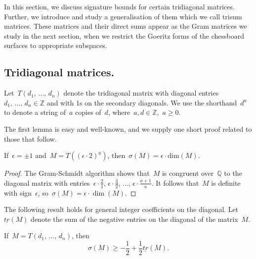 \documentclass[AHL,Unicode,longabstracts,published]{cedram}
\newcommand{\rdim}{\mathrm{dim}}
\newcommand{\bbZ}{\mathbb{Z}}
\newcommand{\bbQ}{\mathbb{Q}}
\begin{document}
In this section, we discuss signature bounds for certain tridiagonal matrices. Further, we introduce and study a generalisation of them which we call trisum matrices. These matrices and their direct sums appear as the Gram matrices we study in the next section, when we restrict the Goeritz forms of the chessboard surfaces to appropriate subspaces.


\subsection{Tridiagonal matrices.} 

Let~$T(d_1,\,\dots,\,d_n)$ denote the tridiagonal matrix with diagonal entries~$d_1,\,\dots,\,d_n \in \bbZ$ and with 1s on the secondary diagonals. We use the shorthand~$d^{\underline a}$ to denote a string of~$a$ copies of~$d$, where~$a,d \in \bbZ$,~$a \ge 0$.

The first lemma is easy and well-known, and we supply one short proof related to those that follow.

\begin{lemm}\label{pathsignature_lemma}
If~$\epsilon = \pm1$ and~$M = T((\epsilon \cdot 2)^{\underline a})$, then~$\sigma(M)= \epsilon \cdot \rdim (M)$.
\end{lemm}

\begin{proof}
The Gram-Schmidt algorithm shows that~$M$ is congruent over~$\bbQ$ to the diagonal matrix with entries~$\epsilon \cdot \frac{2}{1}$, $\epsilon \cdot \frac{3}{2}$, $\dots$, $\epsilon \cdot \frac{a+1}{a}$. It follows that~$M$ is definite with sign~$\epsilon$, so~$\sigma(M) = \epsilon \cdot \dim(M)$.
\end{proof}


The following result holds for general integer coefficients on the diagonal. Let~$\underline{tr}(M)$ denote the sum of the negative entries on the diagonal of the matrix~$M$.

\begin{prop}\label{diagonal_sum_prop}
If~$M = T(d_1,\,\dots,\,d_n)$, then
\[
\sigma(M) \ge -\frac{1}{2} + \frac{1}{2} \underline{tr}(M).
\]
\end{prop}
\end{document}
